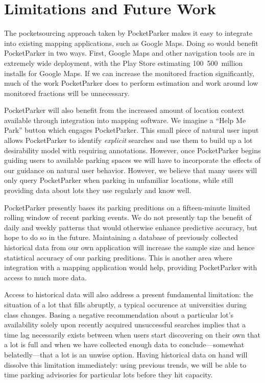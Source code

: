 \section{Limitations and Future Work}
\label{sec-future}

The pocketsourcing approach taken by PocketParker makes it easy to integrate
into existing mapping applications, such as Google Maps. Doing so would
benefit PocketParker in two ways. First, Google Maps and other navigation
tools are in extremely wide deployment, with the Play Store estimating
100~500~million installs for Google Maps. If we can increase the monitored
fraction significantly, much of the work PocketParker does to perform
estimation and work around low monitored fractions will be unnecessary.

PocketParker will also benefit from the increased amount of location context
available through integration into mapping software. We imagine a ``Help Me
Park'' button which engages PocketParker. This small piece of natural user
input allows PocketParker to identify \textit{explicit} searches and use them
to build up a lot desirability model with requiring annotations. However,
once PocketParker begins guiding users to available parking spaces we will
have to incorporate the effects of our guidance on natural user behavior.
However, we believe that many users will only query PocketParker when parking
in unfamiliar locations, while still providing data about lots they use
regularly and know well.

PocketParker presently bases its parking preditions on a fifteen-minute
limited rolling window of recent parking events. We do not presently tap the
benefit of daily and weekly patterns that would otherwise enhance predictive
accuracy, but hope to do so in the future. Maintaining a database of
previously collected historical data from our own application will increase
the sample size and hence statistical accuracy of our parking preditions.
This is another area where integration with a mapping application would help,
providing PocketParker with access to much more data.

Access to historical data will also address a present fundamental limitation:
the situation of a lot that fills abruptly, a typical occurence at
universities during class changes. Basing a negative recommendation about a
particular lot's availability solely upon recently acquired unsuccessful
searches implies that a time lag necessarily exists between when users start
discovering on their own that a lot is full and when we have collected enough
data to conclude---somewhat belatedly---that a lot is an unwise option.
Having historical data on hand will dissolve this limitation immediately:
using previous trends, we will be able to time parking advisories for
particular lots before they hit capacity.


